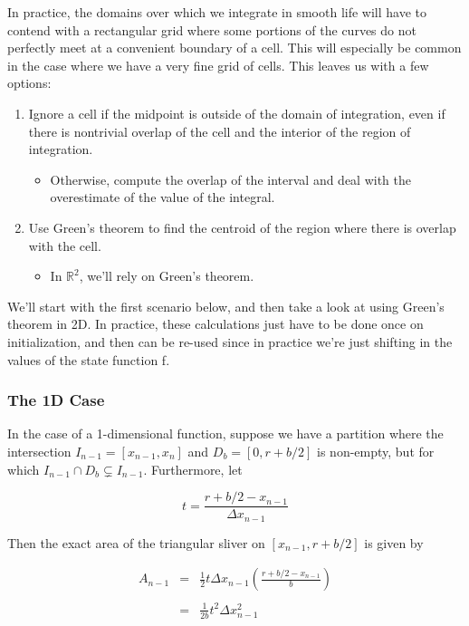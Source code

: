\documentclass{article}
\begin{document}
In practice, the domains over which we integrate in smooth life will have to contend with a rectangular grid where some portions of the curves do not perfectly meet at a convenient boundary of a cell. This will especially be common in the case where we have a very fine grid of cells. This leaves us with a few options:

\begin{enumerate}
    \item Ignore a cell if the midpoint is outside of the domain of integration, even if there is nontrivial overlap of the cell and the interior of the region of integration.
        \begin{itemize}
            \item Otherwise, compute the overlap of the interval and deal with the overestimate of the value of the integral.
        \end{itemize}
    
    \item Use Green's theorem to find the centroid of the region where there is overlap with the cell.
        \begin{itemize}
            \item In $\mathbb{R}^2$, we'll rely on Green's theorem.  
        \end{itemize}
\end{enumerate}

\noindent
We'll start with the first scenario below, and then take a look at using Green's theorem in 2D. In practice, these calculations just have to be done once on initialization, and then can be re-used since in practice we're just shifting in the values of the state function f.

\subsubsection{The 1D Case}

In the case of a 1-dimensional function, suppose we have a partition where the intersection $I_{n-1} = [x_{n-1},x_n]$ and $D_b = [0, r+b/2]$ is non-empty, but for which $I_{n-1} \cap D_b \subsetneq I_{n-1}$. Furthermore, let

\[
    t = \frac{r + b/2 - x_{n-1}}{\Delta x_{n-1}}
\]

\noindent
Then the exact area of the triangular sliver on $[x_{n-1}, r+b/2]$ is given by

\[
\begin{array}{rcl}
    A_{n-1} &=& \displaystyle
                \frac{1}{2}
                t \Delta x_{n-1}
                \left(
                    \frac{r + b/2 - x_{n-1}}{b}
                \right)
                \\
            & &	\\
            &=& \displaystyle
                \frac{1}{2b}
                t^2 \Delta x_{n-1}^2
                \\
\end{array}
\]
\end{document}
